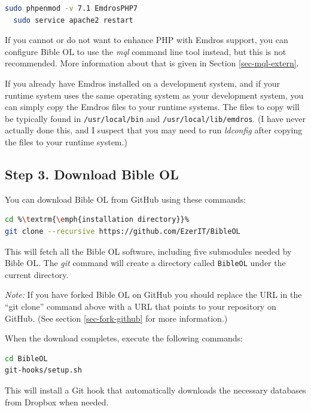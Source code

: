\documentclass[11pt,oneside,a4paper]{memoir}
\begin{document}
\begin{lstlisting}[language=bash]
  sudo phpenmod -v 7.1 EmdrosPHP7
  sudo service apache2 restart
\end{lstlisting}

If you cannot or do not want to enhance PHP with Emdros support, you can configure Bible OL to use
the \emph{mql} command line tool instead, but this is not recommended. More information
about that is given in Section \ref{sec-mql-extern}.

If you already have Emdros installed on a development system, and if your runtime system uses the
same operating system as your development system, you can simply copy the Emdros files to your
runtime systems. The files to copy will be typically found in \texttt{/usr/local/bin} and
\texttt{/usr/local/lib/emdros}. (I have never actually done this, and I suspect that you may need to
run \emph{ldconfig} after copying the files to your runtime system.)


\subsection{Step 3. Download Bible OL}\label{sec-download-bol}

You can download Bible OL from GitHub using these commands:

\begin{lstlisting}[language=bash]
cd %\textrm{\emph{installation directory}}%
git clone --recursive https://github.com/EzerIT/BibleOL
\end{lstlisting}

This will fetch all the Bible OL software, including five submodules needed by Bible OL. The
\emph{git} command will create a directory called \texttt{BibleOL} under the current directory.

\emph{Note:} If you have forked Bible OL on GitHub you should replace the URL in the ``git clone''
command above with a URL that points to your repository on GitHub. (See section
\ref{sec-fork-github} for more information.)

When the download completes, execute the following commands:

\begin{lstlisting}[language=bash]
cd BibleOL
git-hooks/setup.sh
\end{lstlisting}

This will install a Git hook that automatically downloads the necessary databases
from Dropbox when needed.
\end{document}
